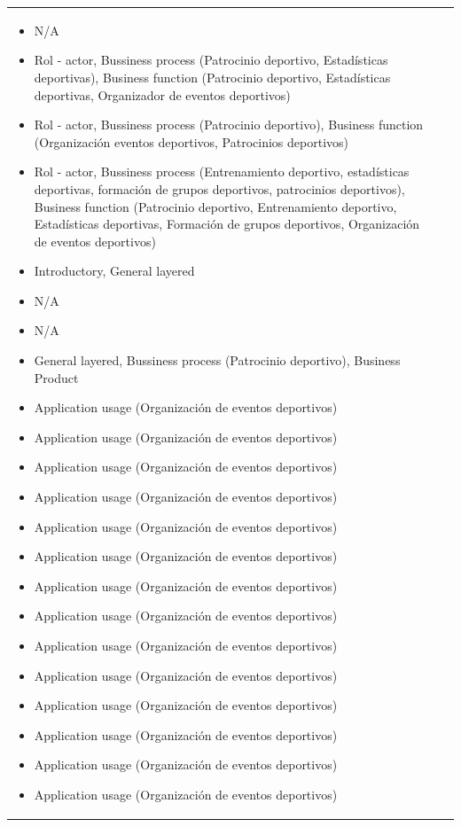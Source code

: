 \begin{table}[!htb]
\begin{center}
{\begin{tabular}{|p{7cm}|p{4cm}|}
			\begin{itemize}
				\item N/A
				\item Rol - actor, Bussiness process (Patrocinio deportivo, Estadísticas deportivas), Business function (Patrocinio deportivo, Estadísticas deportivas, Organizador de eventos deportivos)
				\item Rol - actor, Bussiness process (Patrocinio deportivo), Business function (Organización eventos deportivos, Patrocinios deportivos)
				\item Rol - actor, Bussiness process (Entrenamiento deportivo, estadísticas deportivas, formación de grupos deportivos, patrocinios deportivos), Business function (Patrocinio deportivo, Entrenamiento deportivo, Estadísticas deportivas, Formación de grupos deportivos, Organización de eventos deportivos)
				\item Introductory, General layered
				\item N/A
				\item N/A
				\item General layered, Bussiness process (Patrocinio deportivo), Business Product
				\item Application usage (Organización de eventos deportivos)
				\item Application usage (Organización de eventos deportivos) 
				\item Application usage (Organización de eventos deportivos)
				\item Application usage (Organización de eventos deportivos)
				\item Application usage (Organización de eventos deportivos)
				\item Application usage (Organización de eventos deportivos)
				\item Application usage (Organización de eventos deportivos)
				\item Application usage (Organización de eventos deportivos)
				\item Application usage (Organización de eventos deportivos)
				\item Application usage (Organización de eventos deportivos)
				\item Application usage (Organización de eventos deportivos)
				\item Application usage (Organización de eventos deportivos)
				\item Application usage (Organización de eventos deportivos)
				\item Application usage (Organización de eventos deportivos)

\end{itemize}
\end{tabular}}
\end{center}
\end{table}
